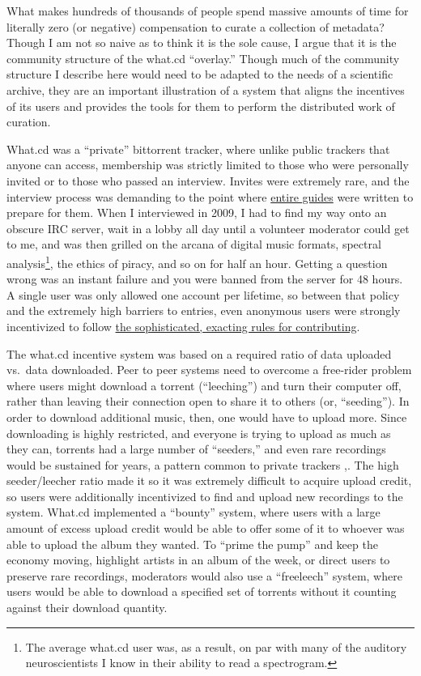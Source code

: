 \documentclass{article}
\begin{document}
What makes hundreds of thousands of people spend massive amounts of time
for literally zero (or negative) compensation to curate a collection of
metadata? Though I am not so naive as to think it is the sole cause, I
argue that it is the community structure of the what.cd ``overlay.''
Though much of the community structure I describe here would need to be
adapted to the needs of a scientific archive, they are an important
illustration of a system that aligns the incentives of its users and
provides the tools for them to perform the distributed work of curation.

What.cd was a ``private'' bittorrent tracker, where unlike public
trackers that anyone can access, membership was strictly limited to
those who were personally invited or to those who passed an interview.
Invites were extremely rare, and the interview process was demanding to
the point where
\href{https://opentrackers.org/whatinterviewprep.com/index.html}{entire
guides} were written to prepare for them. When I interviewed in 2009, I
had to find my way onto an obscure IRC server, wait in a lobby all day
until a volunteer moderator could get to me, and was then grilled on the
arcana of digital music formats, spectral analysis\footnote{The average
  what.cd user was, as a result, on par with many of the auditory
  neuroscientists I know in their ability to read a spectrogram.}, the
ethics of piracy, and so on for half an hour. Getting a question wrong
was an instant failure and you were banned from the server for 48 hours.
A single user was only allowed one account per lifetime, so between that
policy and the extremely high barriers to entries, even anonymous users
were strongly incentivized to follow
\href{https://opentrackers.org/whatinterviewprep.com/prepare-for-the-interview/what-cd-rules/index.html}{the
sophisticated, exacting rules for contributing}.

The what.cd incentive system was based on a required ratio of data
uploaded vs.~data downloaded. Peer to peer systems need to overcome a
free-rider problem where users might download a torrent (``leeching'')
and turn their computer off, rather than leaving their connection open
to share it to others (or, ``seeding''). In order to download additional
music, then, one would have to upload more. Since downloading is highly
restricted, and everyone is trying to upload as much as they can,
torrents had a large number of ``seeders,'' and even rare recordings
would be sustained for years, a pattern common to private trackers \cite{liuUnderstandingImprovingRatio2010},.
The high seeder/leecher ratio made it so it was extremely difficult to
acquire upload credit, so users were additionally incentivized to find
and upload new recordings to the system. What.cd implemented a
``bounty'' system, where users with a large amount of excess upload
credit would be able to offer some of it to whoever was able to upload
the album they wanted. To ``prime the pump'' and keep the economy
moving, highlight artists in an album of the week, or direct users to
preserve rare recordings, moderators would also use a ``freeleech''
system, where users would be able to download a specified set of
torrents without it counting against their download quantity.
\end{document}
